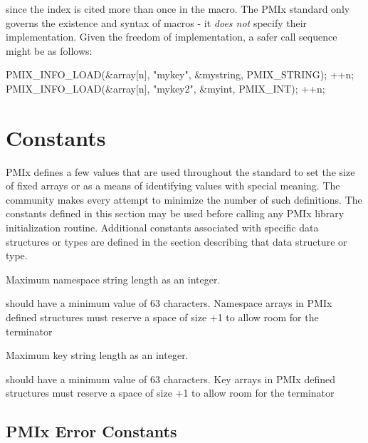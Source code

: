 since the index is cited more than once in the macro. The \ac{PMIx} standard only governs the existence and syntax of macros - it \emph{does not} specify their implementation. Given the freedom of implementation, a safer call sequence might be as follows:

\begin{codepar}
PMIX_INFO_LOAD(&array[n], "mykey", &mystring, PMIX_STRING);
++n;
PMIX_INFO_LOAD(&array[n], "mykey2", &myint, PMIX_INT);
++n;
\end{codepar}

\adviceuserend

\section{Constants}

\ac{PMIx} defines a few values that are used throughout the standard to set the size of fixed arrays or as a means of identifying values with special meaning.
The community makes every attempt to minimize the number of such definitions.
The constants defined in this section may be used before calling any \ac{PMIx} library initialization routine.
Additional constants associated with specific data structures or types are defined in the section describing that data structure or type.

\begin{constantdesc}
%
Maximum namespace string length as an integer.
\end{constantdesc}

\adviceimplstart
{} should have a minimum value of 63 characters. Namespace arrays in \ac{PMIx} defined structures must reserve
a space of size +1 to allow room for the  terminator
\adviceimplend

\begin{constantdesc}
%
Maximum key string length as an integer.
%
\end{constantdesc}

\adviceimplstart
{} should have a minimum value of 63 characters. Key arrays in \ac{PMIx} defined structures must reserve
a space of size +1 to allow room for the  terminator
\adviceimplend


\subsection{PMIx Error Constants}
\label{api:struct:errors}

